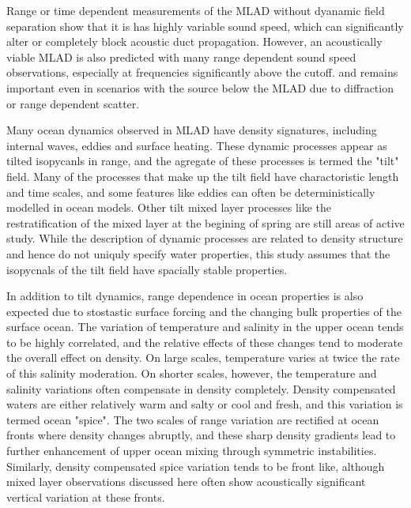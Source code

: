 \documentclass[preprint,NumberedRefs]{JASA}
\begin{document}
Range or time dependent measurements of the MLAD without dyanamic field separation show that it is has highly variable sound speed\citep{cole2010seasonal,rudnick1999compensation,klymak2015}, which can significantly alter or completely block acoustic duct propagation\citep{colosi2020observations,colosi21}. However, an acoustically viable MLAD is also predicted with many range dependent sound speed observations, especially at frequencies significantly above the cutoff. and remains important even in scenarios with the source below the MLAD due to diffraction or range dependent scatter\citep{colosi21}.

Many ocean dynamics observed in MLAD have density signatures, including internal waves, eddies and surface heating. These dynamic processes appear as tilted isopycanls in range, and the agregate of these processes is termed the "tilt" field\cite{dzieciuch2004}. Many of the processes that make up the tilt field have charactoristic length and time scales, and some features like eddies can often be deterministically modelled in ocean models. Other tilt mixed layer processes like the restratification of the mixed layer at the begining of spring are still areas of active study\cite{cole2010seasonal}. While the description of dynamic processes are related to density structure and hence do not uniquly specify water properties, this study assumes that the isopycnals of the tilt field have spacially stable properties.

In addition to tilt dynamics, range dependence in ocean properties is also expected due to stostastic surface forcing and the changing bulk properties of the surface ocean\citep{ferrari2000}. The variation of temperature and salinity in the upper ocean tends to be highly correlated, and the relative effects of these changes tend to moderate the overall effect on density. On large scales, temperature varies at twice the rate of this salinity moderation. On shorter scales, however, the temperature and salinity variations often compensate in density completely. Density compensated waters are either relatively warm and salty or cool and fresh, and this variation is termed ocean "spice"\citep{munk1981evolution}. The two scales of range variation are rectified at ocean fronts where density changes abruptly, and these sharp density gradients lead to further enhancement of upper ocean mixing through symmetric instabilities\citep{dasaro2011}. Similarly, density compensated spice variation tends to be front like, although mixed layer observations discussed here often show acoustically significant vertical variation at these fronts.
\end{document}
